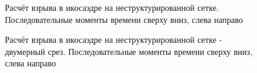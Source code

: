 \begin{figure}%
	\caption{Расчёт взрыва в икосаэдре на неструктурированной сетке. Последовательные моменты времени сверху вниз, слева направо}
	\label{pic:icosahedron-3d-view}
\end{figure}

\begin{figure}%
	\caption{Расчёт взрыва в икосаэдре на неструктурированной сетке - двумерный срез. Последовательные моменты времени сверху вниз, слева направо}
	\label{pic:icosahedron-2d-view}
\end{figure}














